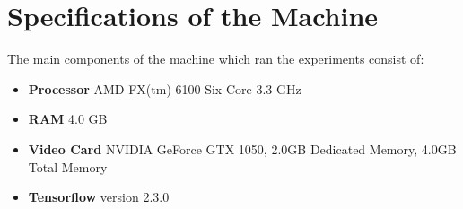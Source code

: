 \chapter{Specifications of the Machine} \label{apd:machine_specs}
The main components of the machine which ran the experiments consist of:
\begin{itemize}
    \item \textbf{Processor} AMD FX(tm)-6100 Six-Core 3.3 GHz
    \item \textbf{RAM} 4.0 GB
    \item \textbf{Video Card} NVIDIA GeForce GTX 1050, 2.0GB Dedicated Memory, 4.0GB Total Memory
    \item \textbf{Tensorflow} version 2.3.0
\end{itemize}